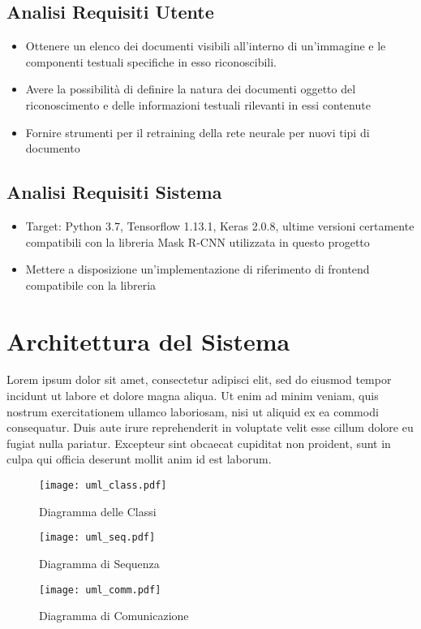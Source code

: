 \documentclass[12pt,a4paper]{article}
\begin{document}
\subsection{Analisi Requisiti Utente}

\begin{itemize}
    \item Ottenere un elenco dei documenti visibili all'interno di
        un'immagine e le componenti testuali specifiche in esso
        riconoscibili.
    \item Avere la possibilità di definire la natura dei documenti
        oggetto del riconoscimento e delle informazioni testuali
        rilevanti in essi contenute
    \item Fornire strumenti per il retraining della rete neurale per
        nuovi tipi di documento
\end{itemize}

\subsection{Analisi Requisiti Sistema}

\begin{itemize}
    \item Target: Python 3.7, Tensorflow 1.13.1, Keras 2.0.8, ultime
        versioni certamente compatibili con la libreria Mask R-CNN
        utilizzata in questo progetto
    \item Mettere a disposizione un'implementazione di riferimento di
        frontend compatibile con la libreria
\end{itemize}

\section{Architettura del Sistema}

Lorem ipsum dolor sit amet, consectetur adipisci elit, sed do eiusmod
tempor incidunt ut labore et dolore magna aliqua. Ut enim ad minim
veniam, quis nostrum exercitationem ullamco laboriosam, nisi ut aliquid
ex ea commodi consequatur. Duis aute irure reprehenderit in voluptate
velit esse cillum dolore eu fugiat nulla pariatur. Excepteur sint
obcaecat cupiditat non proident, sunt in culpa qui officia deserunt
mollit anim id est laborum.

\begin{figure}[p]
  \caption{Diagramma delle Classi}
  \centering
  \texttt{[image: uml\_class.pdf]}
\end{figure}

\begin{figure}[p]
  \caption{Diagramma di Sequenza}
  \centering
  \texttt{[image: uml\_seq.pdf]}
\end{figure}

\begin{figure}[p]
  \caption{Diagramma di Comunicazione}
  \centering
  \texttt{[image: uml\_comm.pdf]}
\end{figure}
\end{document}
